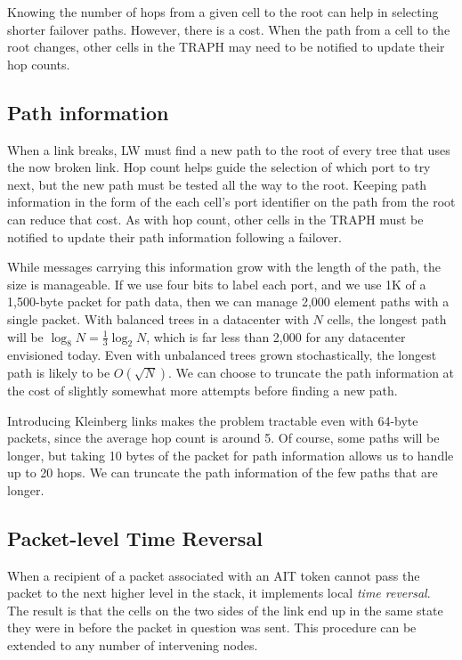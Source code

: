 \documentclass[../OAE-SPEC-MAIN.tex]{subfiles}
\begin{document}
Knowing the number of hops from a given cell to the root can help in selecting shorter failover paths.  However, there is a cost.  When the path from a cell to the root changes, other cells in the TRAPH may need to be notified to update their hop counts.

\subsection{Path information}

When a link breaks, LW must find a new path to the root of every tree that uses the now broken link.  Hop count helps guide the selection of which port to try next, but the new path must be tested all the way to the root.  Keeping path information in the form of the each cell's port identifier on the path from the root can reduce that cost.  As with hop count, other cells in the TRAPH must be notified to update their path information following a failover.

While messages carrying this information grow with the length of the path, the size is manageable.  If we use four bits to label each port, and we use 1K of a 1,500-byte packet for path data, then we can manage 2,000 element paths with a single packet.  With balanced trees in a datacenter with $N$ cells, the longest path will be $\log_8{N} = \frac{1}{3}\log_2{N}$, which is far less than 2,000 for any datacenter envisioned today.  Even with unbalanced trees grown stochastically, the longest path is likely to be $O(\sqrt{N})$.  We can choose to truncate the path information at the cost of slightly somewhat more attempts before finding a new path.

Introducing Kleinberg links makes the problem tractable even with 64-byte packets, since the average hop count is around 5.  Of course, some paths will be longer, but taking 10 bytes of the packet for path information allows us to handle up to 20 hops.  We can truncate the path information of the few paths that are longer.

\subsection{Packet-level Time Reversal}

When a recipient of a packet associated with an AIT token cannot pass the packet to the next higher level in the stack, it implements local \emph{time reversal}.  The result is that the cells on the two sides of the link end up in the same state they were in before the packet in question was sent.  This procedure can be extended to any number of intervening nodes.
\end{document}
